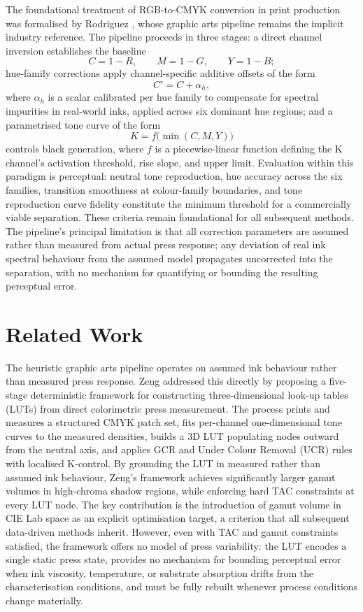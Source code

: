 \documentclass[acmsmall,screen,nonacm]{acmart}
\begin{document}
The foundational treatment of RGB-to-CMYK conversion in print production was formalised by Rodriguez \cite{rodriguez}, whose graphic arts pipeline remains the implicit industry reference. The pipeline proceeds in three stages: a direct channel inversion establishes the baseline
\[
C = 1 - R, \qquad M = 1 - G, \qquad Y = 1 - B;
\]
hue-family corrections apply channel-specific additive offsets of the form
\[
C' = C + \alpha_h,
\]
where $\alpha_h$ is a scalar calibrated per hue family to compensate for spectral impurities in real-world inks, applied across six dominant hue regions; and a parametrised tone curve of the form
\[
K = f\bigl(\min(C,M,Y)\bigr)
\]
controls black generation, where $f$ is a piecewise-linear function defining the K channel's activation threshold, rise slope, and upper limit. Evaluation within this paradigm is perceptual: neutral tone reproduction, hue accuracy across the six families, transition smoothness at colour-family boundaries, and tone reproduction curve fidelity constitute the minimum threshold for a commercially viable separation. These criteria remain foundational for all subsequent methods. The pipeline's principal limitation is that all correction parameters are assumed rather than measured from actual press response; any deviation of real ink spectral behaviour from the assumed model propagates uncorrected into the separation, with no mechanism for quantifying or bounding the resulting perceptual error.

\section{Related Work}

The heuristic graphic arts pipeline operates on assumed ink behaviour rather than measured press response. Zeng \cite{zeng} addressed this directly by proposing a five-stage deterministic framework for constructing three-dimensional look-up tables (LUTs) from direct colorimetric press measurement. The process prints and measures a structured CMYK patch set, fits per-channel one-dimensional tone curves to the measured densities, builds a 3D LUT populating nodes outward from the neutral axis, and applies GCR and Under Colour Removal (UCR) rules with localised K-control. By grounding the LUT in measured rather than assumed ink behaviour, Zeng's framework achieves significantly larger gamut volumes in high-chroma shadow regions, while enforcing hard TAC constraints at every LUT node. The key contribution is the introduction of gamut volume in CIE Lab space as an explicit optimisation target, a criterion that all subsequent data-driven methods inherit. However, even with TAC and gamut constraints satisfied, the framework offers no model of press variability: the LUT encodes a single static press state, provides no mechanism for bounding perceptual error when ink viscosity, temperature, or substrate absorption drifts from the characterisation conditions, and must be fully rebuilt whenever process conditions change materially.
\end{document}
